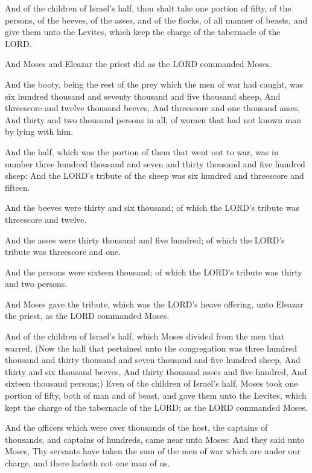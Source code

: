 \Verse And of the children of Israel's half, thou shalt take one
portion of fifty, of the persons, of the beeves, of the asses, and of
the flocks, of all manner of beasts, and give them unto the Levites,
which keep the charge of the tabernacle of the LORD.

\Verse And Moses and Eleazar the priest did as the LORD commanded
Moses.

\Verse And the booty, being the rest of the prey which the men of war
had caught, was six hundred thousand and seventy thousand and five
thousand sheep, \Verse And threescore and twelve thousand beeves, \Verse
And threescore and one thousand asses, \Verse And thirty and two
thousand persons in all, of women that had not known man by lying with
him.

\Verse And the half, which was the portion of them that went out to
war, was in number three hundred thousand and seven and thirty
thousand and five hundred sheep: \Verse And the LORD's tribute of the
sheep was six hundred and threescore and fifteen.

\Verse And the beeves were thirty and six thousand; of which the LORD's
tribute was threescore and twelve.

\Verse And the asses were thirty thousand and five hundred; of which
the LORD's tribute was threescore and one.

\Verse And the persons were sixteen thousand; of which the LORD's
tribute was thirty and two persons.

\Verse And Moses gave the tribute, which was the LORD's heave offering,
unto Eleazar the priest, as the LORD commanded Moses.

\Verse And of the children of Israel's half, which Moses divided from
the men that warred, \Verse (Now the half that pertained unto the
congregation was three hundred thousand and thirty thousand and seven
thousand and five hundred sheep, \Verse And thirty and six thousand
beeves, \Verse And thirty thousand asses and five hundred, \Verse And
sixteen thousand persons;) \Verse Even of the children of Israel's
half, Moses took one portion of fifty, both of man and of beast, and
gave them unto the Levites, which kept the charge of the tabernacle of
the LORD; as the LORD commanded Moses.

\Verse And the officers which were over thousands of the host, the
captains of thousands, and captains of hundreds, came near unto Moses:
\Verse And they said unto Moses, Thy servants have taken the sum of the
men of war which are under our charge, and there lacketh not one man
of us.

